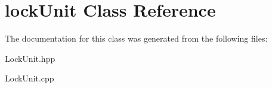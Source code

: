 \hypertarget{classlockUnit}{}\section{lock\+Unit Class Reference}
\label{classlockUnit}


The documentation for this class was generated from the following files\+:\begin{DoxyCompactItemize}
\item 
Lock\+Unit.\+hpp\item 
Lock\+Unit.\+cpp\end{DoxyCompactItemize}
